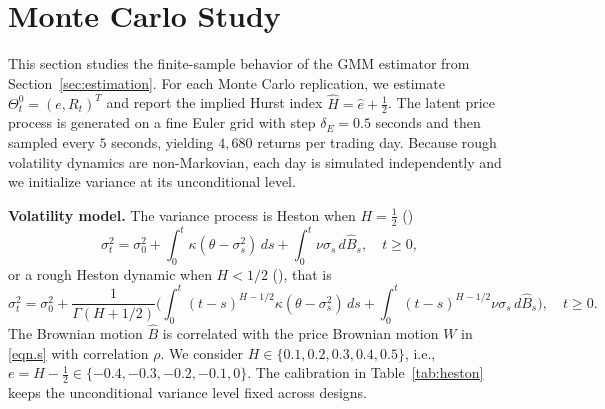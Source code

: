 \documentclass[ecta,nameyear,draft]{econsocart}
\newtheorem{rem}{Remark}
\def\wh{\widehat}
\newcommand{\1}{\mathbf 1}
\def\bfu{{\mathbf u}}
\newcommand{\calW}{\mathcal{W}}
\numberwithin{equation}{section}
\begin{document}
%
%
%
%



\section{Monte Carlo Study}
\label{sec:numerical}



This section studies the finite-sample behavior of the GMM estimator from Section~\ref{sec:estimation}. For each Monte Carlo replication, we estimate $\Theta_t^0=(e,R_t)^T$ and report the implied Hurst index $\wh H=\wh e+\frac12$. The latent price process is generated on a fine Euler grid with step $\delta_E=0.5$ seconds and then sampled every $5$ seconds, yielding $4{,}680$ returns per trading day. Because rough volatility dynamics are non-Markovian, each day is simulated independently and we initialize variance at its unconditional level.

\textbf{Volatility model. } The variance process is Heston when $H=\frac12$ (\cite{heston1993closed})
\begin{equation*}
    \sigma_t^2 = \sigma^2_0 + \int_0^t \kappa(\theta-\sigma^2_s) \, ds + \int_0^t \nu \sigma_s \, d\wh B_s, \quad t\geq 0,
\end{equation*}
or a rough Heston dynamic when $H < 1/2$ (\cite{ER19}), that is
\begin{equation*}
    \sigma_t^2 = \sigma^2_0 + \frac{1}{\Gamma(H+1/2)}\Big( \int_0^t (t-s)^{H-1/2} \kappa(\theta-\sigma^2_s) \, ds + \int_0^t  (t-s)^{H-1/2} \nu \sigma_s \, d\wh B_s\Big), \quad t\geq 0.
\end{equation*}
The Brownian motion $\wh B$ is correlated with the price Brownian motion $W$ in \eqref{eqn.s} with correlation $\rho$. We consider $H\in\{0.1,0.2,0.3,0.4,0.5\}$, i.e., $e=H-\frac12\in\{-0.4,-0.3,-0.2,-0.1,0\}$. The calibration in Table~\ref{tab:heston} keeps the unconditional variance level fixed across designs.
\end{document}
